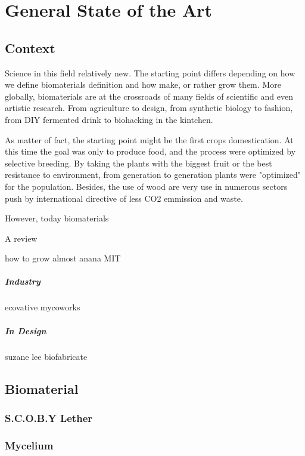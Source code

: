 \chapter{General State of the Art}


\section{Context}
Science in this field relatively new. The starting point differs depending on how we define biomaterials definition and how make, or rather grow them. 
More globally, biomaterials are at the crossroads of many fields of scientific and even artistic research. From agriculture to design, from synthetic biology to fashion, from DIY fermented drink to biohacking in the kintchen.

As matter of fact, the starting point might be the first crops domestication. At this time the goal was only to produce food, and the process were optimized by selective breeding. By taking the plants with the biggest fruit or the best resistance to environment, from generation to generation plants were "optimized" for the population.
Besides, the use of wood are very use in numerous sectors\cite{ramage2017wood} push by international directive of less CO2 emmission and waste. 

However, today biomaterials 

A review 

how to grow almost anana MIT 

\paragraph[short]{Industry} 
ecovative mycoworks 

\paragraph[short]{In Design} 

suzane lee biofabricate 




\section{Biomaterial}
\subsection{S.C.O.B.Y Lether} 


\subsection{Mycelium}


